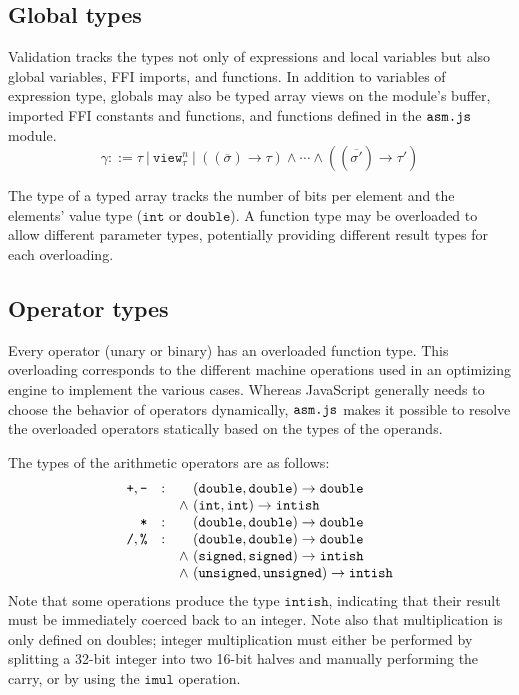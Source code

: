 \documentclass{article}
\newcommand{\funty}[2]{({#1}) \rightarrow {#2}}
\newcommand{\seq}[1]{\overline{{#1}}}
\newcommand{\mathjs}[1]{\mbox{\texttt{{#1}}}}
\newcommand{\unsigned}{\mathtt{unsigned}}
\newcommand{\signed}{\mathtt{signed}}
\newcommand{\double}{\mathtt{double}}
\newcommand{\view}[2]{\mathtt{view}^{#1}_{#2}}
\renewcommand{\int}{\mathtt{int}}
\newcommand{\imul}{\mathtt{imul}}
\newcommand{\intish}{\mathtt{intish}}
\begin{document}
\subsection{Global types}

Validation tracks the types not only of expressions and local
variables but also global variables, FFI imports, and functions. In
addition to variables of expression type, globals may also be typed
array views on the module's buffer, imported FFI constants and
functions, and functions defined in the $\mathjs{asm.js}$ module.
\[
\gamma ::= \tau ~|~ \view{n}{\tau} ~|~ (\funty{\seq{\sigma}}{\tau}) \land \cdots \land (\funty{\seq{\sigma'}}{\tau'})
\]

The type of a typed array tracks the number of bits per element and
the elements' value type ($\int$ or $\double$). A function type may be
overloaded to allow different parameter types, potentially providing
different result types for each overloading.

\subsection{Operator types}

Every operator (unary or binary) has an overloaded function type.
This overloading corresponds to the different machine operations used
in an optimizing engine to implement the various cases. Whereas
JavaScript generally needs to choose the behavior of operators
dynamically, $\mathjs{asm.js}$ makes it possible to resolve the
overloaded operators statically based on the types of the operands.

The types of the arithmetic operators are as follows:
\[
\begin{array}{rcc@{\ }l}
\mathjs{+}, \mathjs{-}
                 & : &       & \funty{\double, \double}{\double} \\
                 &   & \land & \funty{\int, \int}{\intish} \\
\mathjs{*}       & : &       & \funty{\double, \double}{\double} \\
\mathjs{/}, \mathjs{\%}
                 & : &       & \funty{\double, \double}{\double} \\
                 &   & \land & \funty{\signed, \signed}{\intish}  \\
                 &   & \land & \funty{\unsigned, \unsigned}{\intish} \\
\end{array}
\]
Note that some operations produce the type $\intish$, indicating that
their result must be immediately coerced back to an integer. Note also
that multiplication is only defined on doubles; integer multiplication
must either be performed by splitting a 32-bit integer into two 16-bit
halves and manually performing the carry, or by using the $\imul$
operation.
\end{document}
